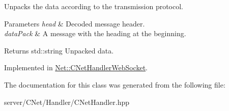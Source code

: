 Unpacks the data according to the transmission protocol. 


\begin{DoxyParams}{Parameters}
{\em head} & Decoded message header. \\
\hline
{\em data\+Pack} & A message with the heading at the beginning. \\
\hline
\end{DoxyParams}
\begin{DoxyReturn}{Returns}
std\+::string Unpacked data. 
\end{DoxyReturn}


Implemented in \mbox{\hyperlink{class_net_1_1_c_net_handler_web_socket_a09297039609dca2d8e2c376626ef78f1}{Net\+::\+C\+Net\+Handler\+Web\+Socket}}.



The documentation for this class was generated from the following file\+:\begin{DoxyCompactItemize}
\item 
server/\+C\+Net/\+Handler/C\+Net\+Handler.\+hpp\end{DoxyCompactItemize}
